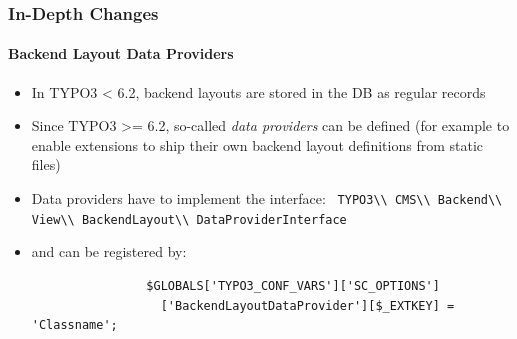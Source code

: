 
\begin{frame}[fragile]
	\frametitle{In-Depth Changes}
	\framesubtitle{Backend Layout Data Providers}

	\begin{itemize}
		\item In TYPO3 < 6.2, backend layouts are stored in the DB as regular records
		\item Since TYPO3 >= 6.2, so-called \emph{data providers} can be defined\newline
			\small(for example to enable extensions to ship their own backend layout definitions from static files)\normalsize

		\item Data providers have to implement the interface:\newline
			\smaller\texttt{
				TYPO3\textbackslash\textbackslash
				CMS\textbackslash\textbackslash
				Backend\textbackslash\textbackslash
				View\textbackslash\textbackslash
				BackendLayout\textbackslash\textbackslash
				DataProviderInterface}\normalsize

		\item and can be registered by:

			\begin{lstlisting}
				$GLOBALS['TYPO3_CONF_VARS']['SC_OPTIONS']
				  ['BackendLayoutDataProvider'][$_EXTKEY] = 'Classname';
			\end{lstlisting}


	\end{itemize}

\end{frame}


